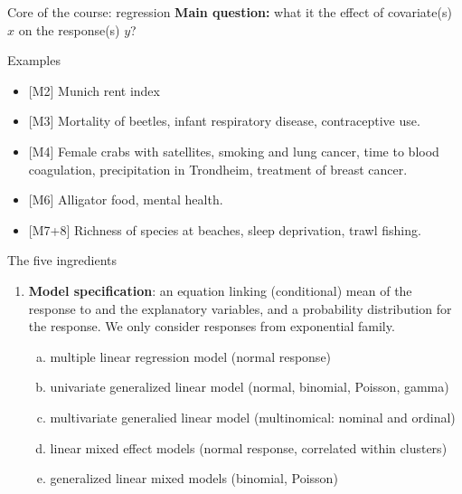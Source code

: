 \documentclass[
  ignorenonframetext,
]{beamer}
\providecommand{\tightlist}{%
  \setlength{\itemsep}{0pt}\setlength{\parskip}{0pt}}
\begin{document}
\begin{frame}{Core of the course: regression}
\protect\hypertarget{core-of-the-course-regression}{}
\textbf{Main question:} what it the effect of covariate(s) \(x\) on the
response(s) \(y\)?

\begin{block}{Examples}
\protect\hypertarget{examples}{}
\begin{itemize}
\tightlist
\item
  {[}M2{]} Munich rent index
\item
  {[}M3{]} Mortality of beetles, infant respiratory disease,
  contraceptive use.
\item
  {[}M4{]} Female crabs with satellites, smoking and lung cancer, time
  to blood coagulation, precipitation in Trondheim, treatment of breast
  cancer.
\item
  {[}M6{]} Alligator food, mental health.
\item
  {[}M7+8{]} Richness of species at beaches, sleep deprivation, trawl
  fishing.
\end{itemize}
\end{block}
\end{frame}

\begin{frame}
\begin{block}{The five ingredients}
\protect\hypertarget{the-five-ingredients}{}
\begin{enumerate}
\tightlist
\item
  \textbf{Model specification}: an equation linking (conditional) mean
  of the response to and the explanatory variables, and a probability
  distribution for the response. We only consider responses from
  exponential family.

  \begin{enumerate}
  [a.]
  \tightlist
  \item
    multiple linear regression model (normal response)
  \item
    univariate generalized linear model (normal, binomial, Poisson,
    gamma)
  \item
    multivariate generalied linear model (multinomical: nominal and
    ordinal)
  \item
    linear mixed effect models (normal response, correlated within
    clusters)
  \item
    generalized linear mixed models (binomial, Poisson)
  \end{enumerate}
\end{enumerate}
\end{block}
\end{frame}
\end{document}
